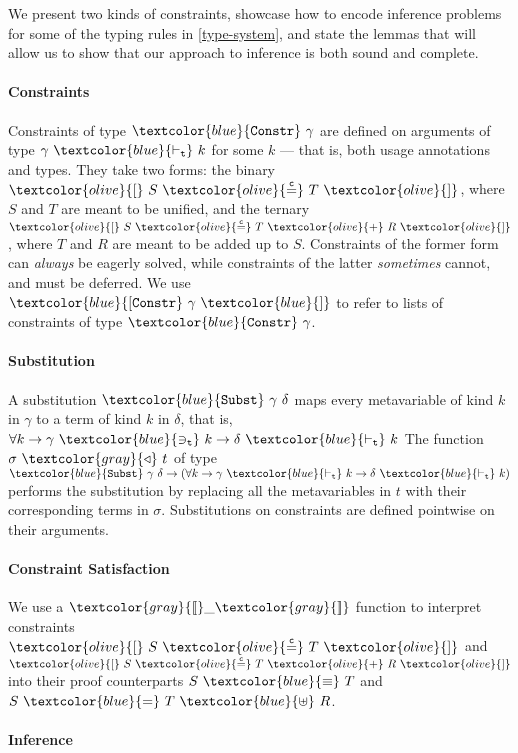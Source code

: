 \documentclass[sigplan,screen,review]{acmart}
\newcommand{\constr}[1]{\textcolor{olive}{\mathtt{#1}}}
\newcommand{\func}[1]{\textcolor{gray}{\mathtt{#1}}}
\newcommand{\type}[1]{\textcolor{blue}{\mathtt{#1}}}
\newcommand{\tvar}[2]{#1 ~\type{\ni_t}~ #2}
\newcommand{\tkind}[2]{#1 ~\type{\vdash_t}~ #2}
\newcommand{\tSplit}[3]{#1~\type{=}~#2~\type{\uplus}~#3}
\newcommand{\tEq}[2]{#1~\type{\equiv}~#2}
\newcommand{\tConstr}[1]{\type{Constr} ~ #1}
\newcommand{\tConstrs}[1]{\type{[Constr} ~ #1 ~ \type{]}}
\newcommand{\subst}[2]{#1 ~ \func{\triangleleft} ~ #2}
\newcommand{\tSubst}[2]{\type{Subst}~#1~#2}
\newcommand{\interpr}[1]{\func{[\![} #1 \func{]\!]}}
\newcommand{\eqconstr}[2]{\constr{[} ~ #1 ~ \constr{\stackrel{c}{=}} ~ #2 ~ \constr{]}}
\newcommand{\sumconstr}[3]{\constr{[} ~ #1 ~ \constr{\stackrel{c}{=}} ~ #2 ~ \constr{+} ~ #3 ~ \constr{]}}
\begin{document}
We present two kinds of constraints, showcase how to encode inference problems for some of the typing rules in \autoref{type-system}, and state the lemmas that will allow us to show that our approach to inference is both sound and complete.

\paragraph{Constraints}

Constraints of type $\tConstr{\gamma}$ are defined on arguments of type $\tkind{\gamma}{k}$ for some $k$ --- that is, both usage annotations and types.
They take two forms: the binary $\eqconstr{S}{T}$, where $S$ and $T$ are meant to be unified, and the ternary $\sumconstr{S}{T}{R}$, where $T$ and $R$ are meant to be added up to $S$.
Constraints of the former form can \emph{always} be eagerly solved, while constraints of the latter \emph{sometimes} cannot, and must be deferred.
We use $\tConstrs{\gamma}$ to refer to lists of constraints of type $\tConstr{\gamma}$.

\paragraph{Substitution}

A substitution $\tSubst{\gamma}{\delta}$ maps every metavariable of kind $k$ in $\gamma$ to a term of kind $k$ in $\delta$, that is, $\forall k \to \tvar{\gamma}{k} \to \tkind{\delta}{k}$
The function $\subst{\sigma}{t}$ of type $\tSubst{\gamma}{\delta} \to (\forall k \to \tkind{\gamma}{k} \to \tkind{\delta}{k})$ performs the substitution by replacing all the metavariables in $t$ with their corresponding terms in $\sigma$.
Substitutions on constraints are defined pointwise on their arguments.

\paragraph{Constraint Satisfaction}

We use a $\interpr{\_}$ function to interpret constraints $\eqconstr{S}{T}$ and $\sumconstr{S}{T}{R}$ into their proof counterparts $\tEq{S}{T}$ and $\tSplit{S}{T}{R}$.

\paragraph{Inference}
\end{document}
